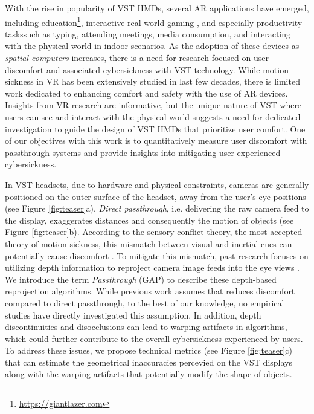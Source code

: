 With the rise in popularity of VST HMDs, several AR applications have emerged, including education\footnote[4]{\url{https://giantlazer.com}}, interactive real-world gaming \cite{arGaming}, and especially productivity tasks\footnotemark[1] such as typing, attending meetings, media consumption, and interacting with the physical world in indoor scenarios. As the adoption of these devices as \emph{spatial computers} increases, there is a need for research focused on user discomfort and associated cybersickness with VST technology. While motion sickness in VR \cite{laviola2000discussion, blum2010effect, chang2020virtual} has been extensively studied in last few decades, there is limited work dedicated to enhancing comfort and safety with the use of AR devices. Insights from VR research are informative, but the unique nature of VST where users can see and interact with the physical world suggests a need for dedicated investigation to guide the design of VST HMDs that prioritize user comfort. One of our objectives with this work is to quantitatively measure user discomfort with passthrough systems and provide insights into mitigating user experienced cybersickness.

In VST headsets, due to hardware and physical constraints, cameras are generally positioned on the outer surface of the headset, away from the user's eye positions (see Figure \ref{fig:teaser}a). \emph{Direct passthrough}, i.e. delivering the raw camera feed to the display, exaggerates distances and consequently the motion of objects (see Figure \ref{fig:teaser}b). According to the sensory-conflict theory, the most accepted theory of motion sickness, this mismatch between visual and inertial cues can potentially cause discomfort \cite{oman1990motion}. To mitigate this mismatch, past research focuses on utilizing depth information to reproject camera image feeds into the eye views \cite{chaurasia2020passthroughplus, Lei2022Neuralpassthrough}. We introduce the term \emph{\DepthPassthrough Passthrough} (GAP) to describe these depth-based reprojection algorithms. While previous work assumes that \GAP reduces discomfort compared to direct passthrough, to the best of our knowledge, no empirical studies have directly investigated this assumption. In addition, depth discontinuities and disocclusions can lead to warping artifacts in \GAP algorithms, which could further contribute to the overall cybersickness experienced by users. To address these issues, we propose technical metrics (see Figure \ref{fig:teaser}c) that can estimate the geometrical inaccuracies percevied on the VST displays along with the warping artifacts that potentially modify the shape of objects.

